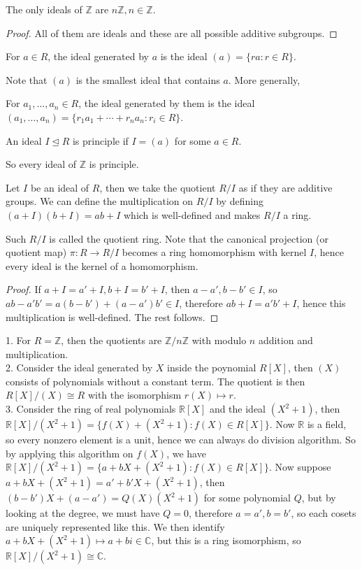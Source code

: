 \begin{lemma}
    The only ideals of $\mathbb Z$ are $n\mathbb Z,n\in\mathbb Z$.
\end{lemma}
\begin{proof}
    All of them are ideals and these are all possible additive subgroups.
\end{proof}
\begin{definition}
    For $a\in R$, the ideal generated by $a$ is the ideal $(a)=\{ra:r\in R\}$.
\end{definition}
Note that $(a)$ is the smallest ideal that contains $a$.
More generally,
\begin{definition}
    For $a_1,\ldots,a_n\in R$, the ideal generated by them is the ideal $(a_1,\ldots,a_n)=\{r_1a_1+\cdots+r_na_n:r_i\in R\}$.
\end{definition}
\begin{definition}
    An ideal $I\unlhd R$ is principle if $I=(a)$ for some $a\in R$.
\end{definition}
So every ideal of $\mathbb Z$ is principle.
\begin{theorem}
    Let $I$ be an ideal of $R$, then we take the quotient $R/I$ as if they are additive groups.
    We can define the multiplication on $R/I$ by defining $(a+I)(b+I)=ab+I$ which is well-defined and makes $R/I$ a ring.
\end{theorem}
Such $R/I$ is called the quotient ring.
Note that the canonical projection (or quotient map) $\pi:R\to R/I$ becomes a ring homomorphism with kernel $I$, hence every ideal is the kernel of a homomorphism.
\begin{proof}
    If $a+I=a'+I,b+I=b'+I$, then $a-a',b-b'\in I$, so $ab-a'b'=a(b-b')+(a-a')b'\in I$, therefore $ab+I=a'b'+I$, hence this multiplication is well-defined.
    The rest follows.
\end{proof}
\begin{example}
    1. For $R=\mathbb Z$, then the quotients are $\mathbb Z/n\mathbb Z$ with modulo $n$ addition and multiplication.\\
    2. Consider the ideal generated by $X$ inside the poynomial $R[X]$, then $(X)$ consists of polynomials without a constant term.
    The quotient is then $R[X]/(X)\cong R$ with the isomorphism $r(X)\mapsto r$.\\
    3. Consider the ring of real polynomials $\mathbb R[X]$ and the ideal $(X^2+1)$, then $\mathbb R[X]/(X^2+1)=\{f(X)+(X^2+1):f(X)\in R[X]\}$.
    Now $\mathbb R$ is a field, so every nonzero element is a unit, hence we can always do division algorithm.
    So by applying this algorithm on $f(X)$, we have $\mathbb R[X]/(X^2+1)=\{a+bX+(X^2+1):f(X)\in R[X]\}$.
    Now suppose $a+bX+(X^2+1)=a'+b'X+(X^2+1)$, then $(b-b')X+(a-a')=Q(X)(X^2+1)$ for some polynomial $Q$, but by looking at the degree, we must have $Q=0$, therefore $a=a',b=b'$, so each cosets are uniquely represented like this.
    We then identify $a+bX+(X^2+1)\mapsto a+bi\in\mathbb C$, but this is a ring isomorphism, so $\mathbb R[X]/(X^2+1)\cong\mathbb C$.
\end{example}
